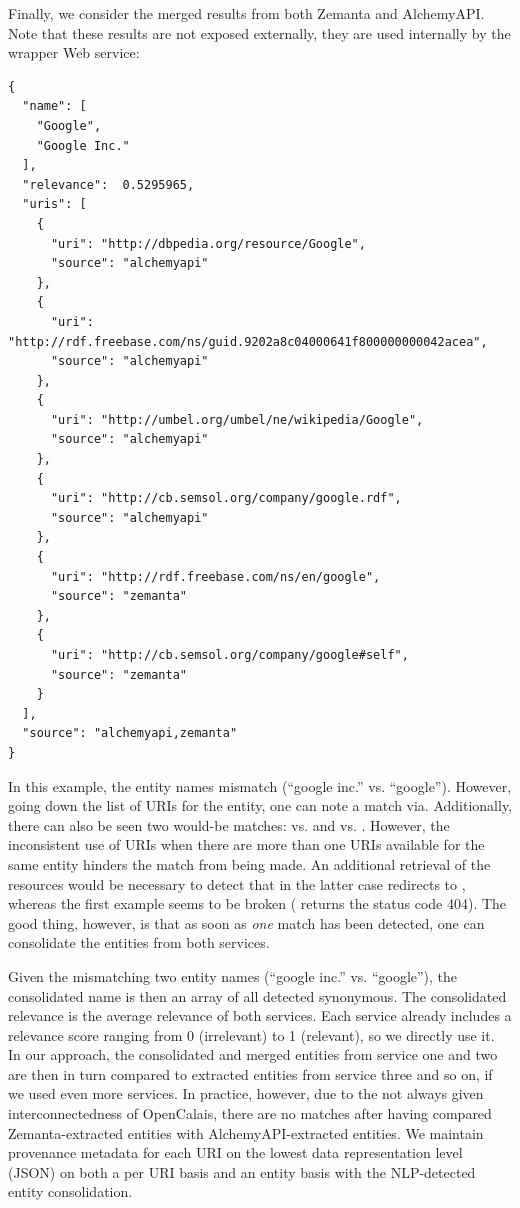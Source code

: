 Finally, we consider the merged results from both Zemanta and AlchemyAPI. Note that these results are not exposed externally, they are used internally by the wrapper Web service:

\begin{lstlisting}
{
  "name": [
    "Google",
    "Google Inc."
  ],
  "relevance":  0.5295965,
  "uris": [
    {
      "uri": "http://dbpedia.org/resource/Google",
      "source": "alchemyapi"
    },
    {
      "uri": "http://rdf.freebase.com/ns/guid.9202a8c04000641f800000000042acea",
      "source": "alchemyapi"
    },
    {
      "uri": "http://umbel.org/umbel/ne/wikipedia/Google",
      "source": "alchemyapi"
    },
    {
      "uri": "http://cb.semsol.org/company/google.rdf",
      "source": "alchemyapi"
    },
    {
      "uri": "http://rdf.freebase.com/ns/en/google",
      "source": "zemanta"
    },
    {
      "uri": "http://cb.semsol.org/company/google#self",
      "source": "zemanta"
    }
  ],
  "source": "alchemyapi,zemanta"
}
\end{lstlisting}

In this example, the entity names mismatch (``google inc.'' vs. ``google''). However, going down the list of URIs for
the entity, one can note a match via. Additionally, there can also
be seen two would-be matches: 
vs. and
 vs.
. However, the inconsistent use of
URIs when there are more than one URIs available for the same entity hinders the match from being made. An additional
retrieval of the resources would be necessary to detect that in the latter case
 redirects to
, whereas the first example seems to be broken
( returns the status code 404). The good thing, however, is
that as soon as \emph{one} match has been detected, one can consolidate the entities from both services.

Given the mismatching two entity names (``google inc.'' vs. ``google''), the consolidated name is then an array of all
detected synonymous. The consolidated relevance is the average relevance of both services. Each service already includes a relevance score ranging from
0 (irrelevant) to 1 (relevant), so we directly use it. In our approach, the consolidated and merged entities from
service one and two are then in turn compared to extracted entities from service three and so on, if we used even more
services. In practice, however, due to the not always given interconnectedness of OpenCalais, there are no matches
after having compared Zemanta-extracted entities with AlchemyAPI-extracted entities. We maintain provenance metadata for each URI on the lowest data representation level (JSON)
on both a per URI basis and an entity basis with the NLP-detected entity consolidation.

